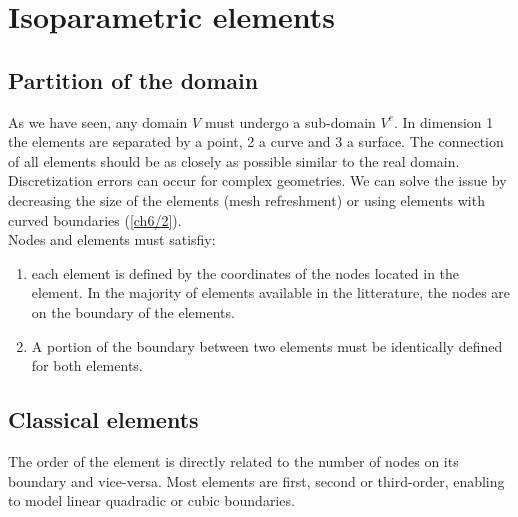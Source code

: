 
\chapter{Isoparametric elements}
\section{Partition of the domain}
	As we have seen, any domain $V$ must undergo a sub-domain $V^e$. In dimension 1 the elements are separated by a point, 2 a curve and 3 a surface. The connection of all elements should be as closely as possible similar to the real domain. Discretization errors can occur for complex geometries. We can solve the issue by decreasing the size of the elements (mesh refreshment) or using elements with curved boundaries (\autoref{ch6/2}). \\
	
	Nodes and elements must satisfiy:
	
	\begin{enumerate}
	\item each element is defined by the coordinates of the nodes located in the element. In the majority of elements available in the litterature, the nodes are on the boundary of the elements. 

	\item  A portion of the boundary between two elements must be identically defined for both elements. 
	\end{enumerate}
	
\section{Classical elements}
	The order of the element is directly related to the number of nodes on its boundary and vice-versa. Most elements are first, second or third-order, enabling to model linear quadradic or cubic boundaries. 
	
